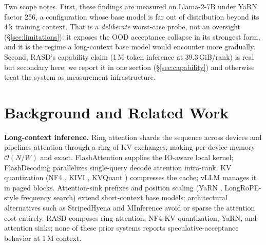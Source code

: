 \documentclass{article}
\begin{document}
Two scope notes. First, these findings are measured on
Llama-2-7B \citep{touvron2023llama2} under YaRN
\citep{peng2023yarn} factor 256, a configuration whose base model
is far out of distribution beyond its 4\,k training context. That
is a \emph{deliberate} worst-case probe, not an oversight
(\S\ref{sec:limitations}): it exposes the OOD acceptance collapse
in its strongest form, and it is the regime a long-context base
model would encounter more gradually. Second, RASD's capability
claim (1\,M-token inference at 39.3\,GiB/rank) is real but
secondary here; we report it in one section
(\S\ref{sec:capability}) and otherwise treat the system as
measurement infrastructure.

\section{Background and Related Work}
\label{sec:related}

\textbf{Long-context inference.} Ring attention
\citep{liu2023ringattention} shards the sequence across devices and
pipelines attention through a ring of KV exchanges, making
per-device memory $\mathcal{O}(N/W)$ and exact. FlashAttention
\citep{dao2022flashattention,dao2023flashattention2} supplies the
IO-aware local kernel; FlashDecoding
\citep{dao2023flashdecoding} parallelizes single-query decode
attention intra-rank. KV quantization (NF4
\citep{dettmers2023qlora,dettmers2022bitsandbytes}, KIVI
\citep{liu2024kivi}, KVQuant \citep{hooper2024kvquant})
compresses the cache; vLLM \citep{kwon2023vllm} manages it in
paged blocks. Attention-sink prefixes \citep{xiao2024streamingllm}
and position scaling (YaRN \citep{peng2023yarn}, LongRoPE-style
frequency search) extend short-context base models; architectural
alternatives such as StripedHyena \citep{poli2023stripedhyena}
and MInference \citep{jiang2024minference} avoid or sparse the
attention cost entirely. RASD composes ring attention, NF4 KV
quantization, YaRN, and attention sinks; none of these prior
systems reports speculative-acceptance behavior at 1\,M context.
\end{document}
